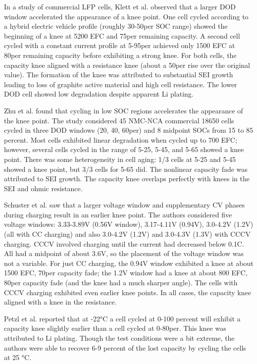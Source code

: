 \documentclass{article}
\begin{document}
In a study of commercial LFP cells, Klett et al. \cite{klett_non-uniform_2014} observed that a larger DOD window accelerated the appearance of a knee point. One cell cycled according to a hybrid electric vehicle profile (roughly 30-50per SOC range) showed the beginning of a knee at 5200 EFC and 75per remaining capacity. A second cell cycled with a constant current profile at 5-95per achieved only 1500 EFC at 80per remaining capacity before exhibiting a strong knee. For both cells, the capacity knee aligned with a resistance knee (about a 50per rise over the original value). The formation of the knee was attributed to substantial SEI growth leading to loss of graphite active material and high cell resistance. The lower DOD cell showed low degradation despite apparent Li plating. 

Zhu et al. \cite{zhu_investigation_2021} found that cycling in low SOC regions accelerates the appearance of the knee point. The study considered 45 NMC-NCA commercial 18650 cells cycled in three DOD windows (20, 40, 60per) and 8 midpoint SOCs from 15 to 85 percent. Most cells exhibited linear degradation when cycled up to 700 EFC; however, several cells cycled in the range of 5-25, 5-45, and 5-65 showed a knee point. There was some heterogeneity in cell aging: 1/3 cells at 5-25 and 5-45 showed a knee point, but 3/3 cells for 5-65 did. The nonlinear capacity fade was attributed to SEI growth. The capacity knee overlaps perfectly with knees in the SEI and ohmic resistance.

Schuster et al. \cite{schuster_nonlinear_2015} saw that a larger voltage window and supplementary CV phases during charging result in an earlier knee point. The authors considered five voltage windows: 3.33-3.89V (0.56V window), 3.17-4.11V (0.94V), 3.0-4.2V (1.2V) (all with CC charging) and also 3.0-4.2V (1.2V) and 3.0-4.3V (1.3V) with CCCV charging. CCCV involved charging until the current had decreased below 0.1C. All had a midpoint of about 3.6V, so the placement of the voltage window was not a variable. For just CC charging, the 0.94V window exhibited a knee at about 1500 EFC, 70per capacity fade; the 1.2V window had a knee at about 800 EFC, 80per capacity fade (and the knee had a much sharper angle). The cells with CCCV charging exhibited even earlier knee points. In all cases, the capacity knee aligned with a knee in the resistance.

Petzl et al. \cite{petzl_lithium_2015} reported that at -22°C a cell cycled at 0-100 percent will exhibit a capacity knee slightly earlier than a cell cycled at 0-80per. This knee was attributed to Li plating. Though the test conditions were a bit extreme, the authors were able to recover 6-9 percent of the lost capacity by cycling the cells at 25 °C.  
\end{document}
